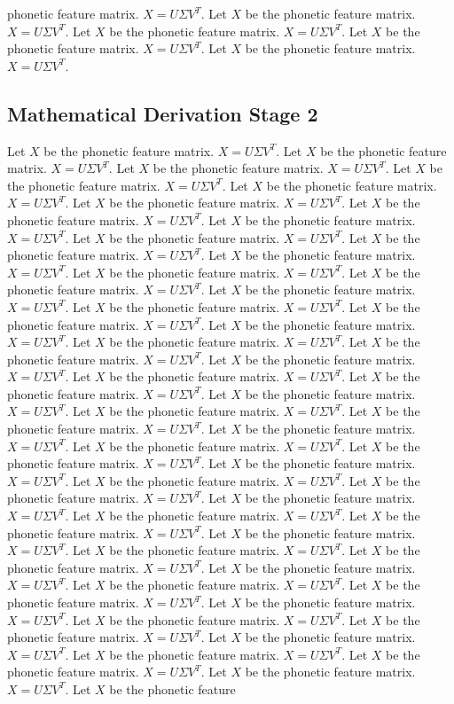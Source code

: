phonetic feature matrix. $X = U\Sigma V^T$. Let $X$ be the phonetic feature matrix. $X = U\Sigma V^T$. Let $X$ be the phonetic feature matrix. $X = U\Sigma V^T$. Let $X$ be the phonetic feature matrix. $X = U\Sigma V^T$. Let $X$ be the phonetic feature matrix. $X = U\Sigma V^T$. 

\subsection{Mathematical Derivation Stage 2}
Let $X$ be the phonetic feature matrix. $X = U\Sigma V^T$. Let $X$ be the phonetic feature matrix. $X = U\Sigma V^T$. Let $X$ be the phonetic feature matrix. $X = U\Sigma V^T$. Let $X$ be the phonetic feature matrix. $X = U\Sigma V^T$. Let $X$ be the phonetic feature matrix. $X = U\Sigma V^T$. Let $X$ be the phonetic feature matrix. $X = U\Sigma V^T$. Let $X$ be the phonetic feature matrix. $X = U\Sigma V^T$. Let $X$ be the phonetic feature matrix. $X = U\Sigma V^T$. Let $X$ be the phonetic feature matrix. $X = U\Sigma V^T$. Let $X$ be the phonetic feature matrix. $X = U\Sigma V^T$. Let $X$ be the phonetic feature matrix. $X = U\Sigma V^T$. Let $X$ be the phonetic feature matrix. $X = U\Sigma V^T$. Let $X$ be the phonetic feature matrix. $X = U\Sigma V^T$. Let $X$ be the phonetic feature matrix. $X = U\Sigma V^T$. Let $X$ be the phonetic feature matrix. $X = U\Sigma V^T$. Let $X$ be the phonetic feature matrix. $X = U\Sigma V^T$. Let $X$ be the phonetic feature matrix. $X = U\Sigma V^T$. Let $X$ be the phonetic feature matrix. $X = U\Sigma V^T$. Let $X$ be the phonetic feature matrix. $X = U\Sigma V^T$. Let $X$ be the phonetic feature matrix. $X = U\Sigma V^T$. Let $X$ be the phonetic feature matrix. $X = U\Sigma V^T$. Let $X$ be the phonetic feature matrix. $X = U\Sigma V^T$. Let $X$ be the phonetic feature matrix. $X = U\Sigma V^T$. Let $X$ be the phonetic feature matrix. $X = U\Sigma V^T$. Let $X$ be the phonetic feature matrix. $X = U\Sigma V^T$. Let $X$ be the phonetic feature matrix. $X = U\Sigma V^T$. Let $X$ be the phonetic feature matrix. $X = U\Sigma V^T$. Let $X$ be the phonetic feature matrix. $X = U\Sigma V^T$. Let $X$ be the phonetic feature matrix. $X = U\Sigma V^T$. Let $X$ be the phonetic feature matrix. $X = U\Sigma V^T$. Let $X$ be the phonetic feature matrix. $X = U\Sigma V^T$. Let $X$ be the phonetic feature matrix. $X = U\Sigma V^T$. Let $X$ be the phonetic feature matrix. $X = U\Sigma V^T$. Let $X$ be the phonetic feature matrix. $X = U\Sigma V^T$. Let $X$ be the phonetic feature matrix. $X = U\Sigma V^T$. Let $X$ be the phonetic feature matrix. $X = U\Sigma V^T$. Let $X$ be the phonetic feature matrix. $X = U\Sigma V^T$. Let $X$ be the phonetic feature matrix. $X = U\Sigma V^T$. Let $X$ be the phonetic feature matrix. $X = U\Sigma V^T$. Let $X$ be the phonetic feature matrix. $X = U\Sigma V^T$. Let $X$ be the phonetic feature matrix. $X = U\Sigma V^T$. Let $X$ be the phonetic feature matrix. $X = U\Sigma V^T$. Let $X$ be the phonetic feature matrix. $X = U\Sigma V^T$. Let $X$ be the phonetic feature matrix. $X = U\Sigma V^T$. Let $X$ be the phonetic feature matrix. $X = U\Sigma V^T$. Let $X$ be the phonetic feature matrix. $X = U\Sigma V^T$. Let $X$ be the phonetic feature matrix. $X = U\Sigma V^T$. Let $X$ be the phonetic feature 